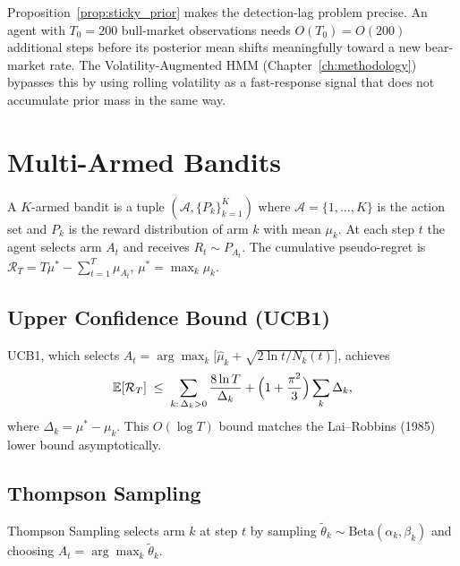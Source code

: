 \begin{remark}
Proposition~\ref{prop:sticky_prior} makes the detection-lag problem precise.
An agent with $T_0 = 200$ bull-market observations needs $O(T_0) = O(200)$
additional steps before its posterior mean shifts meaningfully toward a new
bear-market rate.  The Volatility-Augmented HMM (Chapter~\ref{ch:methodology})
bypasses this by using rolling volatility as a fast-response signal that does
not accumulate prior mass in the same way.
\end{remark}

\section{Multi-Armed Bandits}

\begin{definition}
\label{def:mab}
A $K$-armed bandit is a tuple $(\mathcal{A},\{P_k\}_{k=1}^K)$ where
$\mathcal{A}=\{1,\ldots,K\}$ is the action set and $P_k$ is the reward
distribution of arm $k$ with mean $\mu_k$.  At each step $t$ the agent
selects arm $A_t$ and receives $R_t \sim P_{A_t}$.  The cumulative
pseudo-regret is
$\mathcal{R}_T = T\mu^* - \sum_{t=1}^T \mu_{A_t}$, $\mu^* = \max_k\mu_k$.
\end{definition}

\subsection{Upper Confidence Bound (UCB1)}

\begin{theorem}
\label{thm:ucb_regret}
UCB1, which selects $A_t = \arg\max_k\bigl[\hat\mu_k + \sqrt{2\ln t / N_k(t)}\bigr]$,
achieves
\[
    \mathbb{E}[\mathcal{R}_T] \;\leq\;
    \sum_{k:\,\Delta_k > 0} \frac{8\ln T}{\Delta_k}
    + \Bigl(1+\frac{\pi^2}{3}\Bigr)\sum_k \Delta_k,
\]
where $\Delta_k = \mu^*-\mu_k$.  This $O(\log T)$ bound matches the
Lai--Robbins (1985) lower bound asymptotically.
\end{theorem}

\subsection{Thompson Sampling}

Thompson Sampling selects arm $k$ at step $t$ by sampling
$\tilde\theta_k \sim \mathrm{Beta}(\alpha_k,\beta_k)$ and choosing
$A_t = \arg\max_k\tilde\theta_k$.

